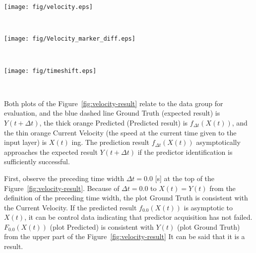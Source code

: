 \documentclass{sigchi}
\begin{document}
\begin{figure*} 
\centering
  \texttt{[image: fig/velocity.eps]}\hspace{-15mm} 
  \caption{$ x $ speed prediction result in the axial direction ($ \Delta t $ represents the preceding time width)}~\label{fig:velocity-result}
\end{figure*}

 \begin{figure*}
\centering
  \texttt{[image: fig/Velocity\_marker\_diff.eps]} \hspace{-15mm} 
  \caption{$ x $ speed prediction result in the axial direction ($ \Delta t $ represents the preceding time width)}~\label{fig:velocity-result}
\end{figure*}


\begin{figure*}
\centering
  \texttt{[image: fig/timeshift.eps]}
  \caption{$ x $ speed prediction result in the axial direction ($ \Delta t $ represents the preceding time width)}~\label{fig:velocity-result}
\end{figure*}




Both plots of the Figure~\ref{fig:velocity-result} relate to the data group for evaluation, and the blue dashed line Ground Truth (expected result) is $ Y (t + \Delta t) $, the thick orange Predicted (Predicted result) is $ f_ {\Delta t} (X (t)) $, and the thin orange Current Velocity (the speed at the current time given to the input layer) is $ X (t) $ ing. The prediction result $ f_ {\Delta t} (X (t)) $ asymptotically approaches the expected result $ Y (t + \Delta t) $ if the predictor identification is sufficiently successful.

First, observe the preceding time width $ \Delta t = 0.0 $ [s] at the top of the Figure~\ref{fig:velocity-result}. Because of $ \Delta t = 0.0 $ to $ X (t) = Y (t) $ from the definition of the preceding time width, the plot Ground Truth is consistent with the Current Velocity. If the predicted result $ f_ {0.0} (X (t)) $ is asymptotic to $ X (t) $, it can be control data indicating that predictor acquisition has not failed. $ F_ {0.0} (X (t)) $ (plot Predicted) is consistent with $ Y (t) $ (plot Ground Truth) from the upper part of the Figure~\ref{fig:velocity-result} It can be said that it is a result.
\end{document}
